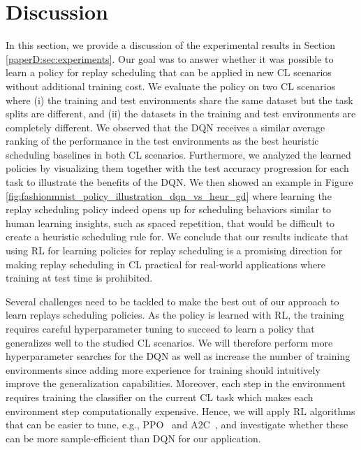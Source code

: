 
\section{Discussion}\label{paperD:sec:discussion}

In this section, we provide a discussion of the experimental results in Section \ref{paperD:sec:experiments}. Our goal was to answer whether it was possible to learn a policy for replay scheduling that can be applied in new CL scenarios without additional training cost. We evaluate the policy on two CL scenarios where (i) the training and test environments share the same dataset but the task splits are different, and (ii) the datasets in the training and test environments are completely different. We observed that the DQN receives a similar average ranking of the performance in the test environments as the best heuristic scheduling baselines in both CL scenarios. Furthermore, we analyzed the learned policies by visualizing them together with the test accuracy progression for each task to illustrate the benefits of the DQN. We then showed an example in Figure \ref{fig:fashionmnist_policy_illustration_dqn_vs_heur_gd} where learning the replay scheduling policy indeed opens up for scheduling behaviors similar to human learning insights, such as spaced repetition, that would be difficult to create a heuristic scheduling rule for. We conclude that our results indicate that using RL for learning policies for replay scheduling is a promising direction for making replay scheduling in CL practical for real-world applications where training at test time is prohibited.   

Several challenges need to be tackled to make the best out of our approach to learn replays scheduling policies. As the policy is learned with RL, the training requires careful hyperparameter tuning to succeed to learn a policy that generalizes well to the studied CL scenarios. We will therefore perform more hyperparameter searches for the DQN as well as increase the number of training environments since adding more experience for training should intuitively improve the generalization capabilities. Moreover, each step in the environment requires training the classifier on the current CL task which makes each environment step computationally expensive. Hence, we will apply RL algorithms that can be easier to tune, e.g., PPO~ and A2C~, and investigate whether these can be more sample-efficient than DQN for our application. 

